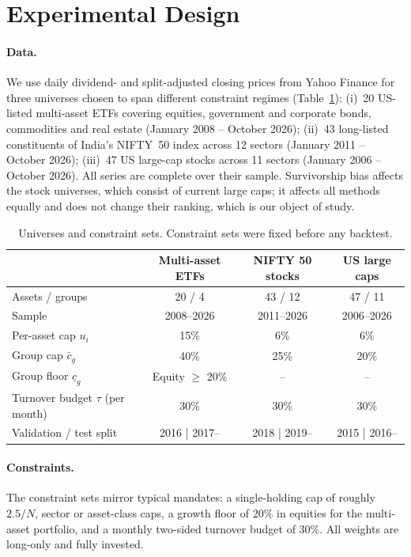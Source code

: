\section{Experimental Design}\label{sec:design}

\paragraph{Data.} We use daily dividend- and split-adjusted closing prices from Yahoo
Finance for three universes chosen to span different constraint regimes
(Table~\ref{tab:universes}): (i)~20 US-listed multi-asset ETFs covering equities, government
and corporate bonds, commodities and real estate (January 2008 -- October 2026);
(ii)~43 long-listed constituents of India's NIFTY~50 index across 12 sectors
(January 2011 -- October 2026); (iii)~47 US large-cap stocks across 11 sectors
(January 2006 -- October 2026). All series are complete over their sample. Survivorship
bias affects the stock universes, which consist of current large caps; it affects all
methods equally and does not change their ranking, which is our object of study.

\begin{table}[!htbp]
\centering\small
\caption{Universes and constraint sets. Constraint sets were fixed before any backtest.}
\label{tab:universes}
\begin{tabular}{lccc}
\toprule
 & Multi-asset ETFs & NIFTY 50 stocks & US large caps\\
\midrule
Assets / groups & 20 / 4 & 43 / 12 & 47 / 11\\
Sample & 2008--2026 & 2011--2026 & 2006--2026\\
Per-asset cap $u_i$ & 15\% & 6\% & 6\%\\
Group cap $\bar c_g$ & 40\% & 25\% & 20\%\\
Group floor $\underline c_g$ & Equity $\ge$ 20\% & -- & --\\
Turnover budget $\tau$ (per month) & 30\% & 30\% & 30\%\\
Validation / test split & 2016 | 2017-- & 2018 | 2019-- & 2015 | 2016--\\
\bottomrule
\end{tabular}
\end{table}

\paragraph{Constraints.} The constraint sets mirror typical mandates: a single-holding cap
of roughly $2.5/N$, sector or asset-class caps, a growth floor of 20\% in equities for the
multi-asset portfolio, and a monthly two-sided turnover budget of 30\%. All weights are
long-only and fully invested.

